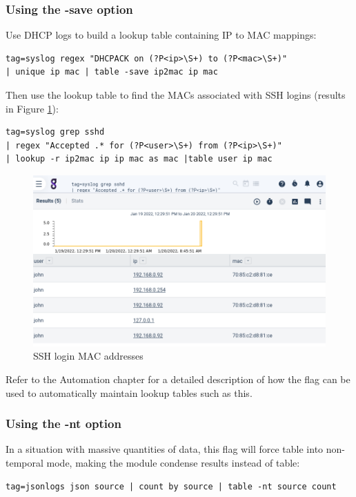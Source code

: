 \subsubsection{Using the -save option}

Use DHCP logs to build a lookup table containing IP to MAC mappings:

\begin{Verbatim}[breaklines=true]
tag=syslog regex "DHCPACK on (?P<ip>\S+) to (?P<mac>\S+)"
| unique ip mac | table -save ip2mac ip mac
\end{Verbatim}

Then use the lookup table to find the MACs associated with SSH
logins (results in Figure \ref{fig:ssh-login-macs}):

\begin{Verbatim}[breaklines=true]
tag=syslog grep sshd
| regex "Accepted .* for (?P<user>\S+) from (?P<ip>\S+)"
| lookup -r ip2mac ip ip mac as mac |table user ip mac
\end{Verbatim}

\begin{figure}
	\includegraphics[width=0.7\linewidth]{images/table-ssh-login.png}
	\caption{SSH login MAC addresses}
	\label{fig:ssh-login-macs}
\end{figure}

Refer to the Automation chapter for a detailed description of how the
 flag can be used to automatically maintain lookup tables such as
this.

\subsubsection{Using the -nt option}

In a situation with massive quantities of data, this flag will force table into
non-temporal mode, making the  module condense results instead of table:

\begin{Verbatim}[breaklines=true]
tag=jsonlogs json source | count by source | table -nt source count
\end{Verbatim}

